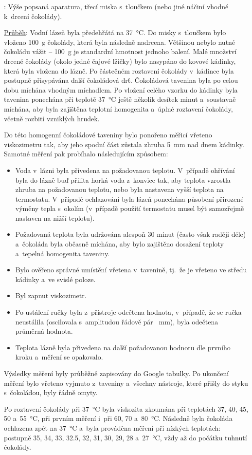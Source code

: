 \documentclass[12pt]{article}
\begin{document}
\underline{}: Výše popsaná aparatura, třecí miska s~tloučkem (nebo jiné náčiní vhodné k~drcení čokolády). 
\par \underline{Průběh}: Vodní lázeň byla předehřátá na \SI{37}{\degreeCelsius}. Do misky s~tloučkem bylo vloženo \SI{100}{\gram} čokolády, která byla následně nadrcena. Většinou nebylo nutné čokoládu vážit -- \SI{100}{\gram} je standardní hmotnost jednoho balení. Malé množství drcené čokolády (okolo jedné čajové lžičky) bylo nasypáno do kovové kádinky, která byla vložena do lázně. Po částečném roztavení čokolády v~kádince byla postupně přisypávána další čokoládová drť. Čokoládová tavenina byla po celou dobu míchána vhodným míchadlem. Po vložení celého vzorku do kádinky byla tavenina ponechána při teplotě \SI{37}{\degreeCelsius} ještě několik desítek minut a~soustavně míchána, aby byla zajištěna teplotní homogenita a~úplné roztavení čokolády, včetně rozbití vzniklých hrudek.
\par
Do této homogenní čokoládové taveniny bylo ponořeno měřicí vřeteno viskozimetru tak, aby jeho spodní část zůstala zhruba \SI{5}{\milli\metre} nad dnem kádinky. Samotné měření pak probíhalo následujícím způsobem:
\begin{itemize}[noitemsep, topsep = 0pt]
    \item Voda v~lázni byla přivedena na požadovanou teplotu. V~případě ohřívání byla do lázně buď přilita horká voda z~konvice tak, aby teplota vzrostla zhruba na požadovanou teplotu, nebo byla nastavena vyšší teplota na termostatu. V~případě ochlazování byla lázeň ponechána působení přirozené výměny tepla s~okolím (v~případě použití termostatu musel být samozřejmě nastaven na nižší teplotu).
    \item Požadovaná teplota byla udržována alespoň 30 minut (často však raději déle) a~čokoláda byla občasně míchána, aby bylo zajištěno dosažení teploty a~tepelná homogenita taveniny.
    \item Bylo ověřeno správné umístění vřetena v~tavenině, tj.~že je vřeteno ve středu kádinky a~ve svislé poloze.
    \item Byl zapnut viskozimetr.
    \item Po ustálení ručky byla z~přístroje odečtena hodnota, v~případě, že se ručka neustálila (oscilovala s~amplitudou řádově pár \SI{}{\milli\metre}), byla odečtena průměrná hodnota.
    \item Teplota lázně byla přivedena na další požadovanou hodnotu dle prvního kroku a~měření se opakovalo.
\end{itemize}
Výsledky měření byly průběžně zapisovány do Google tabulky. Po ukončení měření bylo vřeteno vyjmuto z~taveniny a~všechny nástroje, které přišly do styku s~čokoládou, byly řádně omyty.
\par
Po roztavení čokolády při \SI{37}{\degreeCelsius} byla viskozita zkoumána při teplotách \SI{37}{}, \SI{40}{}, \SI{45}{}, \SI{50}{} a~\SI{55}{\degreeCelsius}, při prvním měření i~při \SI{60}{}, \SI{70}{} a~\SI{80}{\degreeCelsius}. Následně byla čokoláda ochlazena zpět na \SI{37}{\degreeCelsius} a~byla prováděna měření při nízkých teplotách: postupně \SI{35}{}, \SI{34}{}, \SI{33}{}, \SI{32,5}{}, \SI{32}{}, \SI{31}{}, \SI{30}{}, \SI{29}{}, \SI{28}{} a~\SI{27}{\degreeCelsius}, vždy až do počátku tuhnutí čokolády.
\end{document}
